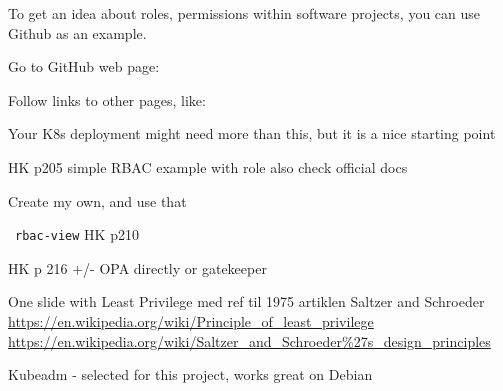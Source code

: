 \documentclass[Screen16to9,17pt]{foils}
\begin{document}



To get an idea about roles, permissions within software projects, you can use Github as an example.

\begin{list2}
\item
Go to GitHub web page:\\
\item Follow links to other pages, like:\\
\item Your K8s deployment might need more than this, but it is a nice starting point
\end{list2}



\begin{list2}
\item HK p205 simple RBAC example with role
also check official docs
\item Create my own, and use that
\end{list2}



\faWrench\ \verb+rbac-view+ HK p210



\begin{list2}
\item
\end{list2}
HK p 216 +/- OPA directly or gatekeeper

One slide with Least Privilege med ref til 1975 artiklen Saltzer and Schroeder\\
\url{https://en.wikipedia.org/wiki/Principle_of_least_privilege}\\
\url{https://en.wikipedia.org/wiki/Saltzer_and_Schroeder%27s_design_principles}

Kubeadm - selected for this project, works great on Debian


\begin{list2}
\item
\end{list2}

\end{document}
